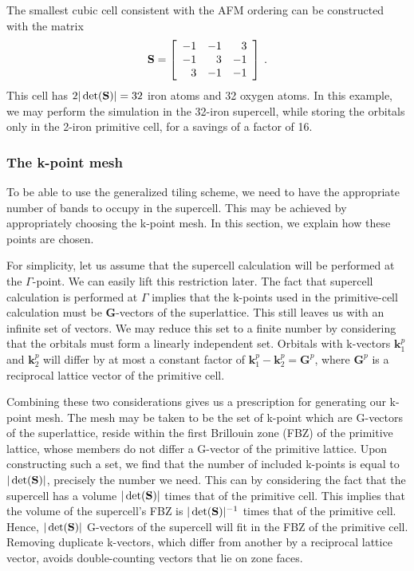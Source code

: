 The smallest cubic cell consistent with the AFM ordering can be
constructed with the matrix
\begin{equation}
\mathbf{S} = \left[\begin{array}{rrr}
  -1 & -1 &  3 \\
  -1 &  3 & -1 \\
   3 & -1 & -1 
  \end{array}\right]\:.
\end{equation}
This cell has $2|\det(\mathbf{S})| = 32$ iron atoms and 32 oxygen atoms.  In
this example, we may perform the simulation in the 32-iron supercell,
while storing the orbitals only in the 2-iron primitive cell, for a
savings of a factor of 16.  

\subsubsection{The k-point mesh}
To be able to use the generalized tiling scheme, we need to
have the appropriate number of bands to occupy in the supercell.
This may be achieved by appropriately choosing the k-point mesh.  In
this section, we explain how these points are chosen.  

For simplicity, let us assume that the supercell calculation will be
performed at the $\Gamma$-point.  We can easily lift this restriction later.  The fact that supercell calculation is performed at
$\Gamma$ implies that the k-points used in the primitive-cell
calculation must be $\mathbf{G}$-vectors of the superlattice.  This
still leaves us with an infinite set of vectors.  We may reduce this
set to a finite number by considering that the orbitals must form a
linearly independent set.  Orbitals with k-vectors $\mathbf{k}^p_1$
and $\mathbf{k}^p_2$ will differ by at most a constant factor of
$\mathbf{k}^p_1 - \mathbf{k}^p_2 = \mathbf{G}^p$, where $\mathbf{G}^p$
is a reciprocal lattice vector of the primitive cell.  

Combining these two considerations gives us a prescription for
generating our k-point mesh.  The mesh may be taken to be the set of
k-point which are G-vectors of the superlattice, reside within the
first Brillouin zone (FBZ) of the primitive lattice, whose members do
not differ a G-vector of the primitive lattice.  Upon constructing
such a set, we find that the number of included k-points is equal to
$|\det(\mathbf{S})|$, precisely the number we need.  This can by considering
the fact that the supercell has a volume $|\det(\mathbf{S})|$ times that of
the primitive cell.  This implies that the volume of the supercell's
FBZ is $|\det(\mathbf{S})|^{-1}$ times that of the primitive cell.  Hence,
$|\det(\mathbf{S})|$ G-vectors of the supercell will fit in the FBZ of the
primitive cell.  Removing duplicate k-vectors, which differ from
another by a reciprocal lattice vector, avoids double-counting vectors
that lie on zone faces.

